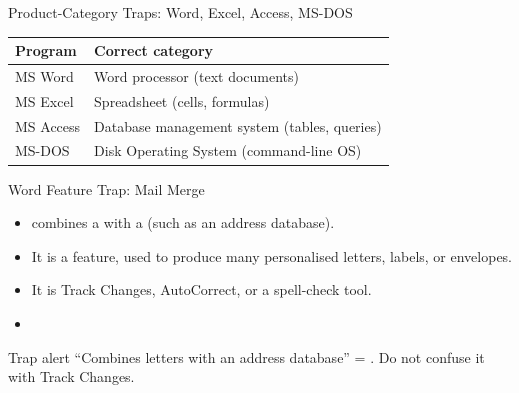 \documentclass[aspectratio=169]{beamer}
\begin{document}
\begin{frame}{Product-Category Traps: Word, Excel, Access, MS-DOS}
  \begin{center}
    \begin{tabular}{p{}p{}}
      \toprule
      \textbf{Program} & \textbf{Correct category} \\
      \midrule
      MS Word & Word processor (text documents) \\
      MS Excel & Spreadsheet (cells, formulas) \\
      MS Access & Database management system (tables, queries) \\
      MS-DOS & Disk Operating System (command-line OS) \\
      \bottomrule
    \end{tabular}
  \end{center}
  \vspace{0.25cm}
\end{frame}

\begin{frame}{Word Feature Trap: Mail Merge}
  \begin{itemize}
    \item {} combines a  with a
       (such as an address database).
    \item It is a  feature, used to produce many personalised
      letters, labels, or envelopes.
    \item It is  Track Changes, AutoCorrect, or a spell-check tool.
    \item {}
  \end{itemize}
  \begin{alertblock}{Trap alert}
    ``Combines letters with an address database'' = . Do not
    confuse it with Track Changes.
  \end{alertblock}
\end{frame}
\end{document}
